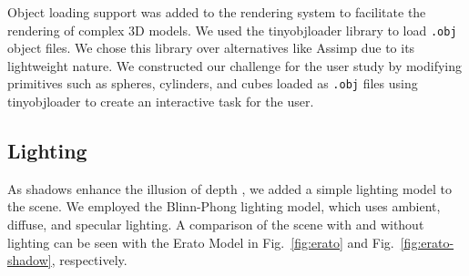 Object loading support was added to the rendering system to facilitate the rendering of complex 3D models. We used the tinyobjloader library \cite{noauthor_tinyobjloadertinyobjloader_2024} to load \texttt{.obj} object files. We chose this library over alternatives like Assimp \cite{noauthor_assimpassimp_2024} due to its lightweight nature. We constructed our challenge for the user study by modifying primitives such as spheres, cylinders, and cubes loaded as \texttt{.obj} files using tinyobjloader to create an interactive task for the user.

\subsection{Lighting}

As shadows enhance the illusion of depth \cite{Kersten1997-xq}, we added a simple lighting model to the scene. We employed the Blinn-Phong \cite{10.1145/563858.563893} lighting model, which uses ambient, diffuse, and specular lighting. A comparison of the scene with and without lighting can be seen with the Erato Model \cite{McGuire2017Data} in Fig.~\ref{fig:erato} and Fig.~\ref{fig:erato-shadow}, respectively.

